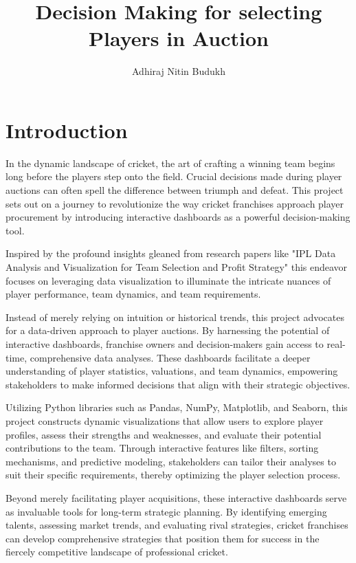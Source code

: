 \documentclass{proc}
\title{Decision Making for selecting Players in Auction}
\author{Adhiraj Nitin Budukh}
\begin{document}
\maketitle 

\section{Introduction}
In the dynamic landscape of cricket, the art of crafting a winning team begins long before the players step onto the field. Crucial decisions made during player auctions can often spell the difference between triumph and defeat. This project sets out on a journey to revolutionize the way cricket franchises approach player procurement by introducing interactive dashboards as a powerful decision-making tool.

Inspired by the profound insights gleaned from research papers like "IPL Data Analysis and Visualization for Team
Selection and Profit Strategy" this endeavor focuses on leveraging data visualization to illuminate the intricate nuances of player performance, team dynamics, and team requirements.

Instead of merely relying on intuition or historical trends, this project advocates for a data-driven approach to player auctions. By harnessing the potential of interactive dashboards, franchise owners and decision-makers gain access to real-time, comprehensive data analyses. These dashboards facilitate a deeper understanding of player statistics, valuations, and team dynamics, empowering stakeholders to make informed decisions that align with their strategic objectives.

Utilizing Python libraries such as Pandas, NumPy, Matplotlib, and Seaborn, this project constructs dynamic visualizations that allow users to explore player profiles, assess their strengths and weaknesses, and evaluate their potential contributions to the team. Through interactive features like filters, sorting mechanisms, and predictive modeling, stakeholders can tailor their analyses to suit their specific requirements, thereby optimizing the player selection process.

Beyond merely facilitating player acquisitions, these interactive dashboards serve as invaluable tools for long-term strategic planning. By identifying emerging talents, assessing market trends, and evaluating rival strategies, cricket franchises can develop comprehensive strategies that position them for success in the fiercely competitive landscape of professional cricket.
\end{document}
